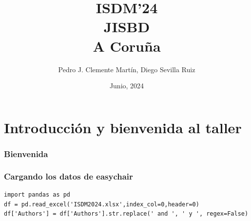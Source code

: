 
\usepackage{arydshln}


\title[ISDM'24, JISBD, A Coruña]{ISDM'24\\JISBD\\A Coruña}

\author{Pedro J. Clemente Martín, Diego Sevilla Ruiz}
\date{Junio, 2024}



\def\insertsectionnumber{\arabic{section}}
\def\insertsubsectionnumber{\arabic{subsection}}



\begin{frame}
  \titlepage
\end{frame}

\section{Introducción y bienvenida al taller}

\begin{frame}
\frametitle{Bienvenida}

\end{frame}

\begin{frame}[fragile]
\frametitle{Cargando los datos de easychair}

\begin{lstlisting}
import pandas as pd
df = pd.read_excel('ISDM2024.xlsx',index_col=0,header=0)
df['Authors'] = df['Authors'].str.replace(' and ', ' y ', regex=False)
\end{lstlisting}

\end{frame}

